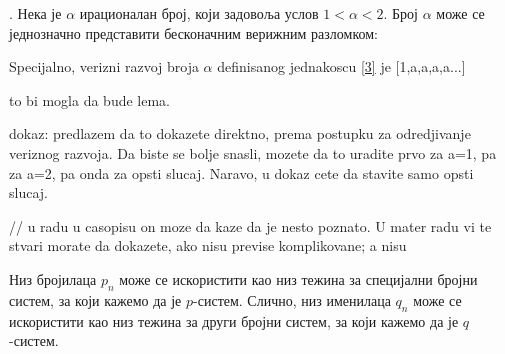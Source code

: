\documentclass[a4paper]{article}
\newtheorem{lemma}{Лема}
\begin{document}



%	
%	
%


. Нека је $ \alpha $ ирационалан број, који задовоља услов $ 1 < \alpha < 2 $. Број  $ \alpha $ може се једнозначно представити бесконачним верижним разломком:

Specijalno, verizni razvoj broja $ \alpha $ definisanog jednakoscu \eqref{3} je
[1,a,a,a,a...]

to bi mogla da bude lema. 

dokaz: predlazem da to dokazete direktno, prema postupku za odredjivanje veriznog razvoja. Da biste se bolje snasli, mozete da to uradite prvo za a=1, pa za a=2, pa onda za opsti slucaj. Naravo, u dokaz cete da stavite samo opsti slucaj.

// u radu u casopisu on moze da kaze da je nesto poznato. U mater radu vi te stvari morate da dokazete, ako nisu previse komplikovane; a nisu

Низ бројилаца $ p_{n} $ може се искористити као низ тежина за специјални бројни систем, за који кажемо да је $ p $-систем. Слично, низ именилаца $ q_{n} $ може се искористити као низ тежина за други бројни систем, за који кажемо да је $ q $-систем.
\end{document}
